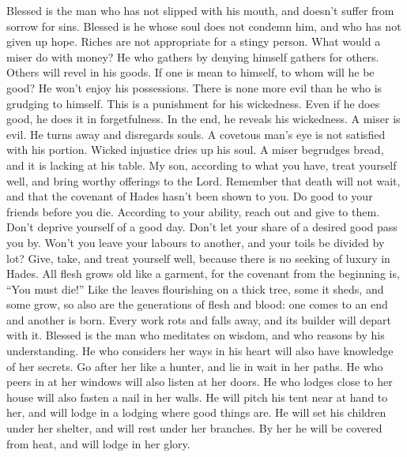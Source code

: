  Blessed is the man who has not slipped with his mouth, and
doesn't suffer from sorrow for sins.  Blessed is he whose
soul does not condemn him, and who has not given up hope. 
Riches are not appropriate for a stingy person. What would a miser do
with money?  He who gathers by denying himself gathers for
others. Others will revel in his goods.  If one is mean to
himself, to whom will he be good? He won't enjoy his possessions.
 There is none more evil than he who is grudging to himself.
This is a punishment for his wickedness.  Even if he does
good, he does it in forgetfulness. In the end, he reveals his
wickedness.  A miser is evil. He turns away and disregards
souls.  A covetous man's eye is not satisfied with his
portion. Wicked injustice dries up his soul.  A miser
begrudges bread, and it is lacking at his table.  My son,
according to what you have, treat yourself well, and bring worthy
offerings to the Lord.  Remember that death will not wait,
and that the covenant of Hades hasn't been shown to you. 
Do good to your friends before you die. According to your ability, reach
out and give to them.  Don't deprive yourself of a good
day. Don't let your share of a desired good pass you by. 
Won't you leave your labours to another, and your toils be divided by
lot?  Give, take, and treat yourself well, because there is
no seeking of luxury in Hades.  All flesh grows old like a
garment, for the covenant from the beginning is, ``You must die!''
 Like the leaves flourishing on a thick tree, some it
sheds, and some grow, so also are the generations of flesh and blood:
one comes to an end and another is born.  Every work rots
and falls away, and its builder will depart with it. 
Blessed is the man who meditates on wisdom, and who reasons by his
understanding.  He who considers her ways in his heart will
also have knowledge of her secrets.  Go after her like a
hunter, and lie in wait in her paths.  He who peers in at
her windows will also listen at her doors.  He who lodges
close to her house will also fasten a nail in her walls. 
He will pitch his tent near at hand to her, and will lodge in a lodging
where good things are.  He will set his children under her
shelter, and will rest under her branches.  By her he will
be covered from heat, and will lodge in her glory.

